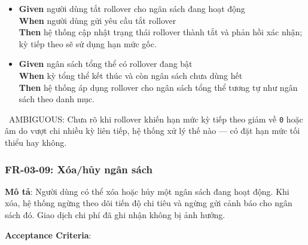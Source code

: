 \begin{itemize}
\item \textbf{Given} người dùng tắt rollover cho ngân sách đang hoạt động  \\ \hspace*{1.5em}  \textbf{When} người dùng gửi yêu cầu tắt rollover  \\ \hspace*{1.5em}  \textbf{Then} hệ thống cập nhật trạng thái rollover thành tắt và phản hồi xác nhận; kỳ tiếp theo sẽ sử dụng hạn mức gốc.
\item \textbf{Given} ngân sách tổng thể có rollover đang bật  \\ \hspace*{1.5em}  \textbf{When} kỳ tổng thể kết thúc và còn ngân sách chưa dùng hết  \\ \hspace*{1.5em}  \textbf{Then} hệ thống áp dụng rollover cho ngân sách tổng thể tương tự như ngân sách theo danh mục.
\end{itemize}
\warningicon\  AMBIGUOUS: Chưa rõ khi rollover khiến hạn mức kỳ tiếp theo giảm về \texttt{0} hoặc âm do vượt chi nhiều kỳ liên tiếp, hệ thống xử lý thế nào — có đặt hạn mức tối thiểu hay không.



\subsubsection{FR-03-09: Xóa/hủy ngân sách}

\textbf{Mô tả}: Người dùng có thể xóa hoặc hủy một ngân sách đang hoạt động. Khi xóa, hệ thống ngừng theo dõi tiến độ chi tiêu và ngừng gửi cảnh báo cho ngân sách đó. Giao dịch chi phí đã ghi nhận không bị ảnh hưởng.



\textbf{Acceptance Criteria}:

